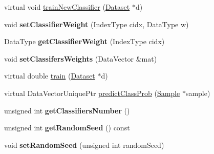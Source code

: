 \begin{DoxyCompactItemize}
\item 
virtual void \hyperlink{classffactory_1_1_extremely_randomized_trees_a31bf52b70e71994cb27814235e3cde43}{train\-New\-Classifier} (\hyperlink{classffactory_1_1_dataset}{Dataset} $\ast$d)
\item 
\hypertarget{classffactory_1_1_extremely_randomized_trees_aa432c99b802b5d2d0d77d39f846e01e6}{void {\bfseries set\-Classifier\-Weight} (Index\-Type cidx, Data\-Type w)}\label{classffactory_1_1_extremely_randomized_trees_aa432c99b802b5d2d0d77d39f846e01e6}

\item 
\hypertarget{classffactory_1_1_extremely_randomized_trees_a7f627dd524d61f4a3c4998fd6108b115}{Data\-Type {\bfseries get\-Classifier\-Weight} (Index\-Type cidx)}\label{classffactory_1_1_extremely_randomized_trees_a7f627dd524d61f4a3c4998fd6108b115}

\item 
\hypertarget{classffactory_1_1_extremely_randomized_trees_a78d678a2ed6f9cc1d8840eb8b7788a99}{void {\bfseries set\-Classifers\-Weights} (Data\-Vector \&mat)}\label{classffactory_1_1_extremely_randomized_trees_a78d678a2ed6f9cc1d8840eb8b7788a99}

\item 
virtual double \hyperlink{classffactory_1_1_extremely_randomized_trees_aa422b510fa91c27fb61eecbd5663cbd8}{train} (\hyperlink{classffactory_1_1_dataset}{Dataset} $\ast$d)
\item 
virtual Data\-Vector\-Unique\-Ptr \hyperlink{classffactory_1_1_extremely_randomized_trees_aed8da96894903e5c8ee7a87add67d78d}{predict\-Class\-Prob} (\hyperlink{classffactory_1_1_sample}{Sample} $\ast$sample)
\item 
\hypertarget{classffactory_1_1_extremely_randomized_trees_aedfa1d3495fa53bedd39ca24d578dd50}{unsigned int {\bfseries get\-Classifiers\-Number} ()}\label{classffactory_1_1_extremely_randomized_trees_aedfa1d3495fa53bedd39ca24d578dd50}

\item 
\hypertarget{classffactory_1_1_extremely_randomized_trees_ae2a706179472df5030c5d882d929f31b}{unsigned int {\bfseries get\-Random\-Seed} () const }\label{classffactory_1_1_extremely_randomized_trees_ae2a706179472df5030c5d882d929f31b}

\item 
\hypertarget{classffactory_1_1_extremely_randomized_trees_a61fdfff8b694983dc66574f307154c77}{void {\bfseries set\-Random\-Seed} (unsigned int random\-Seed)}\label{classffactory_1_1_extremely_randomized_trees_a61fdfff8b694983dc66574f307154c77}


\end{DoxyCompactItemize}
